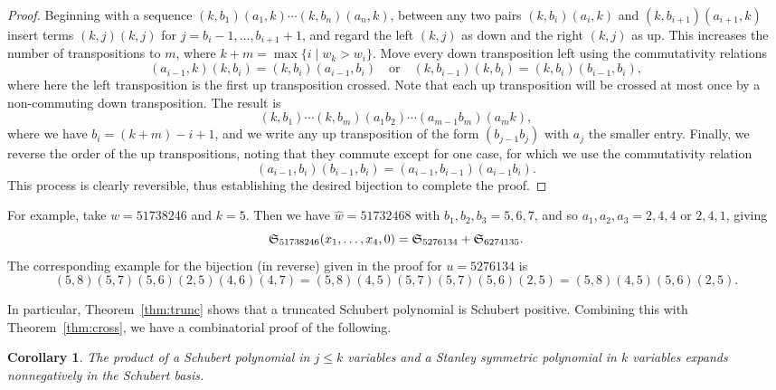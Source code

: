 \documentclass[11pt]{amsart}
\newtheorem{corollary}[theorem]{Corollary}
\theoremstyle{definition}
\theoremstyle{remark}
\numberwithin{equation}{section}
\newcommand{\schubert}{\ensuremath\mathfrak{S}}
\begin{document}
\begin{proof}
  Beginning with a sequence $(k,b_1)(a_1,k) \cdots (k,b_n)(a_n,k)$, between any two pairs $(k,b_i)(a_i,k)$ and $(k,b_{i+1})(a_{i+1},k)$ insert terms $(k,j)(k,j)$ for $j=b_i-1,\ldots,b_{i+1}+1$, and regard the left $(k,j)$ as down and the right $(k,j)$ as up. This increases the number of transpositions to $m$, where $k+m = \max\{i \mid w_k > w_i\}$. Move every down transposition left using the commutativity relations
  \[ (a_{i-1}, k) (k, b_{i}) = (k, b_{i}) (a_{i-1}, b_{i}) \hspace{1em} \mbox{or} \hspace{1em} (k, b_{i-1}) (k, b_{i}) = (k, b_{i}) (b_{i-1}, b_{i}),  \]
  where here the left transposition is the first up transposition crossed. Note that each up transposition will be crossed at most once by a non-commuting down transposition. The result is
  \[ (k, b_1) \cdots (k, b_m) (a_1 b_2) \cdots (a_{m-1} b_m) (a_m k), \]
  where we have $b_i = (k+m)-i+1$, and we write any up transposition of the form $(b_{j-1} b_{j})$ with $a_j$ the smaller entry. Finally, we reverse the order of the up transpositions, noting that they commute except for one case, for which we use the commutativity relation
  \[ (a_{i-1}, b_i) (b_{i-1}, b_i) = (a_{i-1},b_{i-1}) (a_{i-1}b_{i}). \]
  This process is clearly reversible, thus establishing the desired bijection to complete the proof.
\end{proof}

For example, take $w=51738246$ and $k=5$. Then we have $\hat{w}=51732468$ with $b_1,b_2,b_3 = 5,6,7$, and so $a_1,a_2,a_3 = 2,4,4$ or $2,4,1$, giving
\begin{displaymath}
  \schubert_{51738246}(x_1,\ldots,x_4,0) = \schubert_{5276134} + \schubert_{6274135}.
\end{displaymath}
The corresponding example for the bijection (in reverse) given in the proof for $u=5276134$ is
\begin{displaymath}
  (5,8)(5,7)(5,6)(2,5)(4,6)(4,7) = (5,8)(4,5)(5,7)(5,7)(5,6)(2,5) = (5,8)(4,5)(5,6)(2,5).
\end{displaymath}

In particular, Theorem~\ref{thm:trunc} shows that a truncated Schubert polynomial is Schubert positive. Combining this with Theorem~\ref{thm:cross}, we have a combinatorial proof of the following.

\begin{corollary}
  The product of a Schubert polynomial in $j\leq k$ variables and a Stanley symmetric polynomial in $k$ variables expands nonnegatively in the Schubert basis.
\end{corollary}
\end{document}
